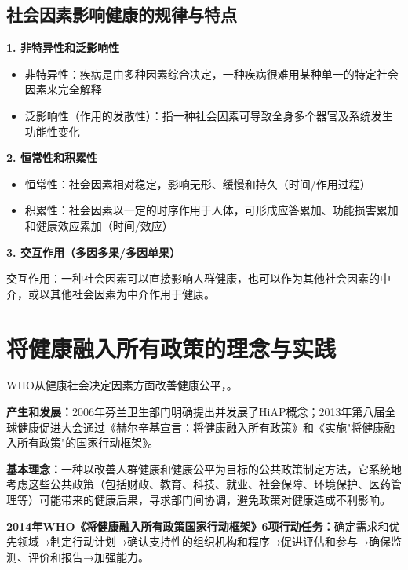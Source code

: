 \subsection{社会因素影响健康的规律与特点}

\begin{keybox}
\textbf{1. 非特异性和泛影响性}
\begin{itemize}[leftmargin=*]
    \item 非特异性：疾病是由多种因素综合决定，一种疾病很难用某种单一的特定社会因素来完全解释
    \item 泛影响性（作用的发散性）：指一种社会因素可导致全身多个器官及系统发生功能性变化
\end{itemize}

\textbf{2. 恒常性和积累性}
\begin{itemize}[leftmargin=*]
    \item 恒常性：社会因素相对稳定，影响无形、缓慢和持久（时间/作用过程）
    \item 积累性：社会因素以一定的时序作用于人体，可形成应答累加、功能损害累加和健康效应累加（时间/效应）
\end{itemize}

\textbf{3. 交互作用（多因多果/多因单果）}

交互作用：一种社会因素可以直接影响人群健康，也可以作为其他社会因素的中介，或以其他社会因素为中介作用于健康。
\end{keybox}

\section{将健康融入所有政策的理念与实践}

\begin{defbox}
WHO从健康社会决定因素方面改善健康公平，。

\textbf{产生和发展：}2006年芬兰卫生部门明确提出并发展了HiAP概念；2013年第八届全球健康促进大会通过《赫尔辛基宣言：将健康融入所有政策》和《实施"将健康融入所有政策"的国家行动框架》。

\textbf{基本理念：}一种以改善人群健康和健康公平为目标的公共政策制定方法，它系统地考虑这些公共政策（包括财政、教育、科技、就业、社会保障、环境保护、医药管理等）可能带来的健康后果，寻求部门间协调，避免政策对健康造成不利影响。

\textbf{2014年WHO《将健康融入所有政策国家行动框架》6项行动任务：}确定需求和优先领域→制定行动计划→确认支持性的组织机构和程序→促进评估和参与→确保监测、评价和报告→加强能力。
\end{defbox}

